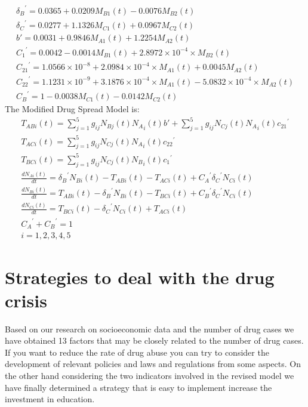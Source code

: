 \documentclass{mcmthesis}
\begin{document}
	

\begin{equation}\begin{array}{l}
{\delta _B}^\prime  = 0.0365 + 0.0209{M_{B1}}(t) - 0.0076{M_{B2}}(t)\\
{\delta _C}^\prime  = 0.0277 + 1.1326{M_{C1}}(t) + 0.0967{M_{C2}}(t)\\
b' = 0.0031 + 0.9846{M_{A1}}(t) + 1.2254{M_{A2}}(t)\\
{C_1}^\prime  = 0.0042 - 0.0014{M_{B1}}(t) + 2.8972 \times {10^{ - 4}} \times {M_{B2}}(t)\\
{C_{21}}^\prime  = 1.0566 \times {10^{ - 8}} + 2.0984 \times {10^{ - 4}} \times {M_{A1}}(t) + 0.0045{M_{A2}}(t)\\
{C_{22}}^\prime  = 1.1231 \times {10^{ - 9}} + 3.1876 \times {10^{ - 4}} \times {M_{A1}}(t) - 5.0832 \times {10^{ - 4}} \times {M_{A2}}(t)\\
{C_B}^\prime  = 1 - 0.0038{M_{C1}}(t) - 0.0142{M_{C2}}(t)
\end{array}\end{equation}
The Modified Drug Spread Model is:
\begin{equation}\begin{array}{l}
{T_{ABi}}(t) = \sum\limits_{j = 1}^5 {{g_{ij}}{N_{Bj}}(t){N_A}_i(t)} b' + \sum\limits_{j = 1}^5 {{g_{ij}}{N_{Cj}}(t)} {N_A}_i(t){c_{21}}^\prime \\
{T_{ACi}}(t) = \sum\limits_{j = 1}^5 {{g_{ij}}{N_{Cj}}(t)} {N_A}_i(t){c_{22}}^\prime \\
{T_{BCi}}(t) = \sum\limits_{j = 1}^5 {{g_{ij}}{N_{Cj}}(t)} {N_B}_i(t){c_1}^\prime \\
\frac{{d{N_{Ai}}(t)}}{{dt}} = {\delta _B}^\prime {N_{Bi}}(t) - {T_{ABi}}(t) - {T_{ACi}}(t) + {C_A}^\prime {\delta _C}^\prime {N_{Ci}}(t)\\
\frac{{d{N_{Bi}}(t)}}{{dt}} = {T_{ABi}}(t) - {\delta _B}^\prime {N_{Bi}}(t) - {T_{BCi}}(t) + {C_B}^\prime {\delta _C}^\prime {N_{Ci}}(t)\\
\frac{{d{N_{Ci}}(t)}}{{dt}} = {T_{BCi}}(t) - {\delta _C}^\prime {N_{Ci}}(t) + {T_{ACi}}(t)\\
{C_A}^\prime  + {C_B}^\prime  = 1\\
i = 1,2,3,4,5
\end{array}\end{equation}

%
%

\section{Strategies to deal with the drug crisis}
Based on our research on socioeconomic data and the number of drug cases we have obtained 13 factors that may be closely related to the number of drug cases.  If you want to reduce the rate of drug abuse you can try to consider the development of relevant policies and laws and regulations from some aspects.  On the other hand considering the two indicators involved in the revised model we have finally determined a strategy that is easy to implement increase the investment in education.
\end{document}
